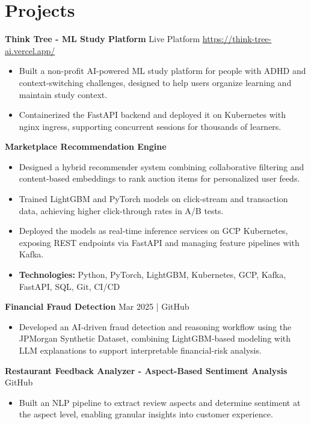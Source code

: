 \documentclass[10pt,a4paper]{article}
\begin{document}
\section{Projects}
\textbf{Think Tree - ML Study Platform} \textbar{} Live Platform \textbar{} \href{https://think-tree-ai.vercel.app/}{https://think-tree-ai.vercel.app/}\par
\begin{itemize}
  \item Built a non-profit AI-powered ML study platform for people with ADHD and context-switching challenges, designed to help users organize learning and maintain study context.
  \item Containerized the FastAPI backend and deployed it on Kubernetes with nginx ingress, supporting concurrent sessions for thousands of learners.
\end{itemize}
\textbf{Marketplace Recommendation Engine}\par
\begin{itemize}
  \item Designed a hybrid recommender system combining collaborative filtering and content-based embeddings to rank auction items for personalized user feeds.
  \item Trained LightGBM and PyTorch models on click-stream and transaction data, achieving higher click-through rates in A/B tests.
  \item Deployed the models as real-time inference services on GCP Kubernetes, exposing REST endpoints via FastAPI and managing feature pipelines with Kafka.
  \item \textbf{Technologies:} Python, PyTorch, LightGBM, Kubernetes, GCP, Kafka, FastAPI, SQL, Git, CI/CD
\end{itemize}
\textbf{Financial Fraud Detection} \textbar{} Mar 2025 | GitHub\par
\begin{itemize}
  \item Developed an AI-driven fraud detection and reasoning workflow using the JPMorgan Synthetic Dataset, combining LightGBM-based modeling with LLM explanations to support interpretable financial-risk analysis.
\end{itemize}
\textbf{Restaurant Feedback Analyzer - Aspect-Based Sentiment Analysis} \textbar{} GitHub\par
\begin{itemize}
  \item Built an NLP pipeline to extract review aspects and determine sentiment at the aspect level, enabling granular insights into customer experience.
\end{itemize}
\end{document}
